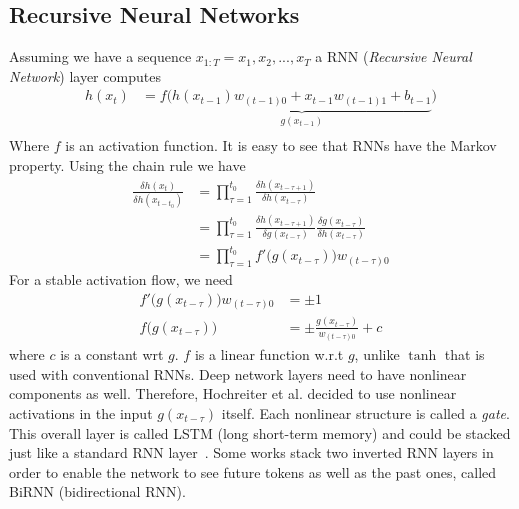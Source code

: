 \documentclass{book}
\numberwithin{equation}{subsection}
\begin{document}
\subsection{Recursive Neural Networks}
Assuming we have a sequence $x_{1:T} = x_1, x_2, ..., x_T$ a RNN (\textit{Recursive Neural Network}) layer computes
\begin{align}
    h(x_t) &= f\big(\underbrace{h(x_{t-1})w_{(t-1)0} + x_{t-1}w_{(t-1)1} + b_{t-1}}_{g(x_{t-1})}\big)\\
\end{align}
Where $f$ is an activation function. It is easy to see that RNNs have the Markov property. Using the chain rule we have
\begin{align}
    \frac{\delta h(x_t)}{\delta h(x_{t-t_0})}
    &= \prod_{\tau=1}^{t_0}\frac{\delta h(x_{t-\tau+1})}{\delta h(x_{t-\tau})}\\
    &= \prod_{\tau=1}^{t_0}\frac{\delta h(x_{t-\tau+1})}{\delta g(x_{t-\tau})}\frac{\delta g(x_{t-\tau})}{\delta h(x_{t-\tau})}\\
    &= \prod_{\tau=1}^{t_0}f'\Big(g(x_{t-\tau})\Big)w_{(t-\tau)0}
\end{align}
For a stable activation flow, we need
\begin{align}
    f'\Big(g(x_{t-\tau})\Big)w_{(t-\tau)0} &= \pm 1\\
    f\Big(g(x_{t-\tau})\Big) &= \pm \frac{g(x_{t-\tau})}{w_{(t-\tau)0}} + c
\end{align}
where $c$ is a constant wrt $g$. $f$ is a linear function w.r.t $g$, unlike $\tanh$ that is used with conventional RNNs. Deep network layers need to have nonlinear components as well. Therefore, Hochreiter et al. decided to use nonlinear activations in the input $g(x_{t-\tau})$ itself. Each nonlinear structure is called a \textit{gate}. This overall layer is called LSTM (long short-term memory) and could be stacked just like a standard RNN layer~\cite{hochreiter_long_1997}. Some works stack two inverted RNN layers in order to enable the network to see future tokens as well as the past ones, called BiRNN (bidirectional RNN).
\end{document}
